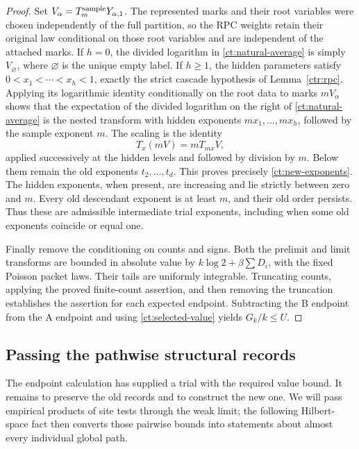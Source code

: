 \begin{proof}
Set $V_\alpha=T_m^{\rm sample}Y_{\alpha,1}$.  The represented marks
and their root variables were chosen independently of the full partition,
so the RPC weights retain their original law conditional on those root
variables and are independent of the attached marks.  If $h=0$, the
divided logarithm in \eqref{ct:natural-average} is simply
$V_{\varnothing}$, where $\varnothing$ is the unique empty label.
If $h\ge1$, the hidden parameters satisfy
$0<x_1<\cdots<x_h<1$, exactly the strict cascade hypothesis of
Lemma~\ref{ctr:rpc}.  Applying its logarithmic identity conditionally on
the root data to marks $mV_\alpha$ shows that
the expectation of the divided logarithm on the right of
\eqref{ct:natural-average} is the nested transform with hidden
exponents $mx_1,\ldots,mx_h$, followed by the sample exponent $m$.
The scaling is the identity
\[
                            T_x(mV)=mT_{mx}V,
\]
applied successively at the hidden levels and followed by division
by $m$.  Below them remain the old exponents $t_2,\ldots,t_d$.
This proves precisely \eqref{ct:new-exponents}.  The hidden exponents,
when present, are increasing and lie strictly between zero and $m$.
Every old descendant exponent is at least $m$, and their old order
persists.  Thus these are admissible intermediate trial exponents,
including when some old exponents coincide or equal one.

Finally remove the conditioning on counts and signs.  Both the
prelimit and limit transforms are bounded in absolute value by
$k\log2+\beta\sum D_i$, with the fixed Poisson packet laws.
Their tails are uniformly integrable.  Truncating counts, applying
the proved finite-count assertion, and then removing the truncation
establishes the assertion for each expected endpoint.  Subtracting
the B endpoint from the A endpoint and using
\eqref{ct:selected-value} yields $G_k/k\le U$.
\end{proof}

\subsection{Passing the pathwise structural records}\label{ct:sub-records}

The endpoint calculation has supplied a trial with the required value
bound.  It remains to preserve the old records and to construct the new
one.  We will pass empirical products of site tests through the weak
limit; the following Hilbert-space fact then converts those pairwise
bounds into statements about almost every individual global path.

